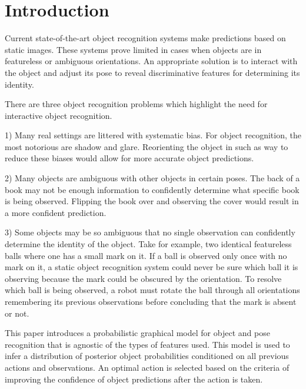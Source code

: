 \section{Introduction}
    \label{sec:intro}


    Current state-of-the-art object recognition systems make predictions based on static images. These systems prove limited in cases when objects are in featureless or ambiguous orientations. An appropriate solution is to interact with the object and adjust its pose to reveal discriminative features for determining its identity.

    There are three object recognition problems which highlight the need for interactive object recognition.

    1) Many real settings are littered with systematic bias. For object recognition, the most notorious are shadow and glare. Reorienting the object in such as way to reduce these biases would allow for more accurate object predictions.

    2) Many objects are ambiguous with other objects in certain poses. The back of a book may not be enough information to confidently determine what specific book is being observed. Flipping the book over and observing the cover would result in a more confident prediction. 

    3) Some objects may be so ambiguous that no single observation can confidently determine the identity of the object. Take for example, two identical featureless balls where one has a small mark on it. If a ball is observed only once with no mark on it, a static object recognition system could never be sure which ball it is observing because the mark could be obscured by the orientation. To resolve which ball is being observed, a robot must rotate the ball through all orientations remembering its previous observations before concluding that the mark is absent or not.

    This paper introduces a probabilistic graphical model for object and pose recognition that is agnostic of the types of  features used. This model is used to infer a distribution of posterior object probabilities conditioned on all previous actions and observations. An optimal action is selected based on the criteria of improving the confidence of object predictions after the action is taken. 

